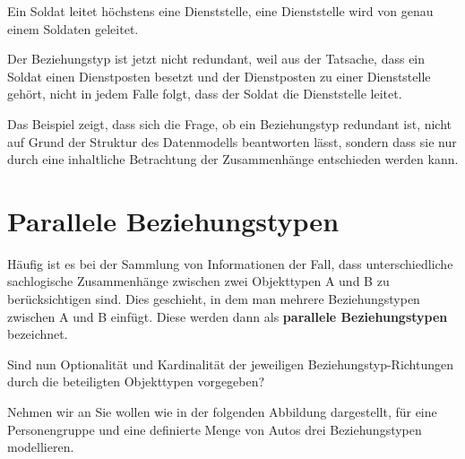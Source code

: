           Ein Soldat leitet höchstens eine Dienststelle, eine Dienststelle wird von genau einem Soldaten geleitet.
          \begin{center}
          \end{center}
          Der Beziehungstyp ist jetzt nicht redundant, weil aus der Tatsache, dass ein Soldat einen Dienstposten besetzt und der Dienstposten zu einer Dienststelle gehört, nicht in jedem Falle folgt, dass der Soldat die Dienststelle leitet.

          Das Beispiel zeigt, dass sich die Frage, ob ein Beziehungstyp redundant ist, nicht auf Grund der Struktur des Datenmodells beantworten lässt, sondern dass sie nur durch eine inhaltliche Betrachtung der Zusammenhänge entschieden werden kann.
      \section{Parallele Beziehungstypen}
        Häufig ist es bei der Sammlung von Informationen der Fall, dass unterschiedliche sachlogische Zusammenhänge zwischen zwei Objekttypen A und B zu berücksichtigen sind. Dies geschieht, in dem man mehrere Beziehungstypen zwischen A und B einfügt. Diese werden dann als \textbf{parallele Beziehungstypen} bezeichnet.

        Sind nun Optionalität und Kardinalität der jeweiligen Beziehungstyp-Richtungen durch die beteiligten Objekttypen vorgegeben?

        Nehmen wir an Sie wollen wie in der folgenden Abbildung dargestellt, für eine Personengruppe und eine definierte Menge von Autos drei Beziehungstypen modellieren.

